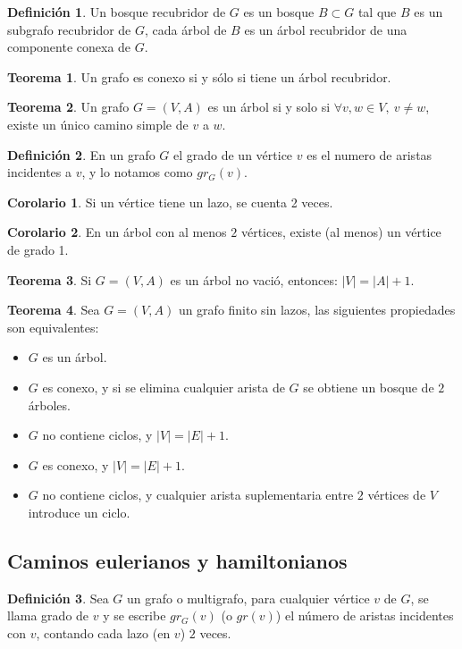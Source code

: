 \documentclass[10pt]{article}
\theoremstyle{definition}
\newtheorem{definition}{Definición}[section]
\newtheorem{theorem}{Teorema}[section]
\newtheorem{corollary}{Corolario}[theorem]
\begin{document}
\begin{definition}
	Un bosque recubridor de $G$ es un bosque $B\subset G$ tal que $B$ es un subgrafo recubridor de $G$, cada árbol de $B$ es un árbol recubridor de una componente conexa de $G$.
\end{definition}
\begin{theorem}
	Un grafo es conexo si y sólo si tiene un árbol recubridor.
\end{theorem}
\begin{theorem}
	Un grafo $G=(V,A)$ es un árbol si y solo si $\forall v,w\in V,\ v\neq w$, existe un único camino simple de $v$ a $w$.
\end{theorem}
\begin{definition}
	En un grafo $G$ el grado de un vértice $v$ es el numero de aristas incidentes a $v$, y lo notamos como $gr_G(v)$.
\end{definition}
\begin{corollary}
	Si un vértice tiene un lazo, se cuenta 2 veces.
\end{corollary}
\begin{corollary}
	En un árbol con al menos $2$ vértices, existe (al menos) un vértice de grado 1.
\end{corollary}
\begin{theorem}
	Si $G=(V,A)$ es un árbol no vació, entonces: $|V|=|A|+1$.
\end{theorem}
\begin{theorem}
	Sea $G=(V,A)$ un grafo finito sin lazos, las siguientes propiedades son equivalentes:
	\begin{itemize}
		\item $G$ es un árbol.
		\item $G$ es conexo, y si se elimina cualquier arista de $G$ se obtiene un bosque de $2$ árboles.
		\item $G$ no contiene ciclos, y $|V|=|E|+1$.
		\item $G$ es conexo, y $|V|=|E|+1$.
		\item $G$ no contiene ciclos, y cualquier arista suplementaria entre $2$ vértices de $V$ introduce un ciclo.
	\end{itemize}
\end{theorem}
\newpage\subsection{Caminos eulerianos y hamiltonianos}
\begin{definition}
	Sea $G$ un grafo o multigrafo, para cualquier vértice $v$ de $G$, se llama grado de $v$ y se escribe $gr_G(v)$ (o $gr(v)$) el número de aristas incidentes con $v$, contando cada lazo (en $v$) $2$ veces.
\end{definition}
\end{document}
